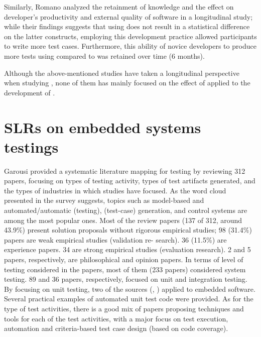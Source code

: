Similarly, Romano \etal \cite{DBLP:conf/esem/Fucci0BCSTJ18} analyzed the retainment of \tdd knowledge and the effect on developer's productivity and external quality of software in a longitudinal study; while their findings suggests that using \tdd does not result in a statistical difference on the latter constructs, employing this development practice allowed participants to write more test cases. Furthermore, this ability of novice developers to produce more tests using \tdd compared to \notdd was retained over time (6 months).

Although the above-mentioned studies have taken a longitudinal perspective when studying \tdd, none of them has mainly focused on the effect of \tdd applied to the development of \ess.


\section{SLRs on embedded systems testings}
Garousi \etal \cite{DBLP:journals/infsof/GarousiFKY18} provided a systematic literature mapping for \es testing by reviewing 312 papers, focusing on types of testing activity, types of test artifacts generated, and the types of industries in which studies have focused. As the word cloud presented in the survey suggests, topics such as model-based and automated/automatic (testing), (test-case) generation, and control systems are among the most popular ones. Most of the review papers (137 of 312, around 43.9\%) present solution proposals without rigorous empirical studies; 98 (31.4\%) papers are weak empirical studies (validation re-
search). 36 (11.5\%) are experience papers. 34 are strong empirical studies (evaluation research). 2 and 5 papers, respectively, are philosophical and opinion papers.
In terms of level of testing considered in the papers, most of them (233 papers) considered system testing. 89 and 36 papers, respectively, focused on unit and integration testing. By focusing on unit testing, two of the sources (\cite{4428578}, \cite{DBLP:conf/isese/GuanOA06}) applied \tdd to embedded software. Several practical examples of automated unit test code were provided.
As for the type of test activities, there is a good mix of papers proposing techniques and tools for each of the test activities, with a major focus on test execution, automation and criteria-based test case design (\eg based on code coverage).
